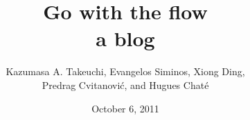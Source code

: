 \title{ 			Go with the flow
       \\ \Huge 	a blog
        \\\vspace{1.0cm}
        }\author{
		Kazumasa A. Takeuchi,
        Evangelos Siminos,
        Xiong Ding,
		\\
        Predrag Cvitanovi\'{c},
         and
        Hugues Chat\'e
        }

        \date{October 6, 2011} \Private{\date{\today}}
